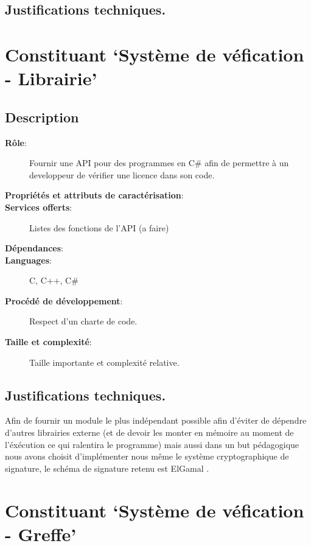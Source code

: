 \subsection{Justifications techniques.}

\section{Constituant `Système de véfication - Librairie'}
\subsection{Description}
\begin{description}
	\item[\textbf{Rôle}:]
		Fournir une API pour des programmes en C\# afin de 
		permettre à un developpeur de vérifier une licence dans son code.
	\item[\textbf{Propriétés et attributs de caractérisation}:]
	\item[\textbf{Services offerts}:]
		Listes des fonctions de l'API (a faire)
	\item[\textbf{Dépendances}:]
	\item[\textbf{Languages}:]
		C, C++, C\#
	\item[\textbf{Procédé de développement}:]
		Respect d'un charte de code. 
	\item[\textbf{Taille et complexité}:]
		Taille importante et complexité relative.
\end{description}

\subsection{Justifications techniques.}
Afin de fournir un module le plus indépendant possible afin d'éviter de dépendre d'autres 
librairies externe (et de devoir les monter en mémoire au moment de l'éxécution ce qui 
ralentira le programme) mais aussi dans un but pédagogique nous avons choisit d'implémenter nous même le système cryptographique de signature, le schéma de signature retenu est 
ElGamal \cite{ElGamal}.

\section{Constituant `Système de véfication - Greffe'}
